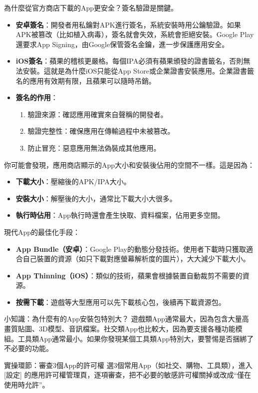 
為什麼從官方商店下載的App更安全？簽名驗證是關鍵。

\begin{itemize}
  \item \textbf{安卓簽名}：開發者用私鑰對APK進行簽名，系統安裝時用公鑰驗證。如果APK被篡改（比如植入病毒），簽名就會失效，系統會拒絕安裝。Google Play還要求App Signing，由Google保管簽名金鑰，進一步保護應用安全。
  \item \textbf{iOS簽名}：蘋果的稽核更嚴格。每個IPA必須有蘋果頒發的證書籤名，否則無法安裝。這就是為什麼iOS只能從App Store或企業證書安裝應用。企業證書籤名的應用有效期有限，且蘋果可以隨時吊銷。
  \item \textbf{簽名的作用}：
  \begin{enumerate}
    \item 驗證來源：確認應用確實來自聲稱的開發者。
    \item 驗證完整性：確保應用在傳輸過程中未被篡改。
    \item 防止冒充：惡意應用無法偽裝成其他應用。
  \end{enumerate}
\end{itemize}


你可能會發現，應用商店顯示的App大小和安裝後佔用的空間不一樣。這是因為：

\begin{itemize}
  \item \textbf{下載大小}：壓縮後的APK/IPA大小。
  \item \textbf{安裝大小}：解壓後的大小，通常比下載大小大很多。
  \item \textbf{執行時佔用}：App執行時還會產生快取、資料檔案，佔用更多空間。
\end{itemize}

現代App的最佳化手段：

\begin{itemize}
  \item \textbf{App Bundle（安卓）}：Google Play的動態分發技術。使用者下載時只獲取適合自己裝置的資源（如只下載對應螢幕解析度的圖片），大大減少下載大小。
  \item \textbf{App Thinning（iOS）}：類似的技術，蘋果會根據裝置自動裁剪不需要的資源。
  \item \textbf{按需下載}：遊戲等大型應用可以先下載核心包，後續再下載資源包。
\end{itemize}

\begin{tcbinfo}{小知識：為什麼有的App安裝包特別大？}
遊戲類App通常最大，因為包含大量高畫質貼圖、3D模型、音訊檔案。社交類App也比較大，因為要支援各種功能模組。工具類App通常最小。如果你發現某個工具類App特別大，要警惕是否捆綁了不必要的功能。

\end{tcbinfo}

\begin{tcbpractice}{實操環節：審查3個App的許可權}
選3個常用App（如社交、購物、工具類），進入 [設定] 的應用許可權管理頁，逐項審查，把不必要的敏感許可權關掉或改成“僅在使用時允許”。

\end{tcbpractice}
